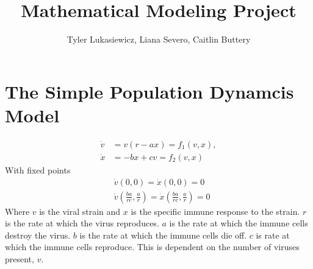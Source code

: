 \documentclass{article}
\title{Mathematical Modeling Project}
\author{Tyler Lukasiewicz, Liana Severo, Caitlin Buttery}
\begin{document}
\maketitle
\section{The Simple Population Dynamcis Model}
\begin{equation}
    \begin{split}
        \dot v &= v(r-ax) = f_1(v,x), \\
        \dot x &= -bx + cv = f_2(v,x)
    \end{split}
\end{equation}
With fixed points 
\begin{equation}
    \begin{split}
        &\dot v(0,0) =  \dot x(0,0) = 0 \\
        &\dot v(\frac{ba}{rc} ,\frac{a}{r} ) = \dot x(\frac{ba}{rc} ,\frac{a}{r} ) = 0
    \end{split}
\end{equation}
Where $v$ is the viral strain and $x$ is the specific immune response to the strain. $r$ is the rate at which the virus reproduces. $a$ is the rate at which the immune cells destroy the virus. $b$ is the rate at which the immune cells die off. $c$ is rate at which the immune cells reproduce. This is dependent on the number of viruses present, $v$.  
\end{document}
